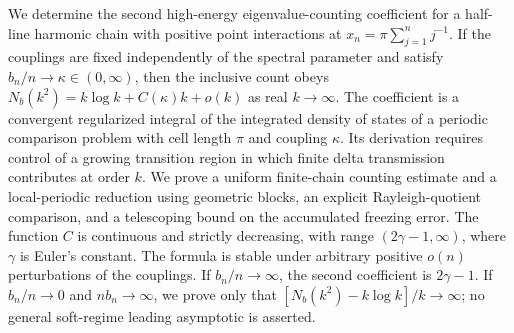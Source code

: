 We determine the second high-energy eigenvalue-counting coefficient for
a half-line harmonic chain with positive point interactions at
$x_n=\pi\sum_{j=1}^n j^{-1}$. If the couplings are fixed independently
of the spectral parameter and satisfy $b_n/n\to\kappa\in(0,\infty)$,
then the inclusive count obeys
$N_b(k^2)=k\log k+C(\kappa)k+o(k)$ as real $k\to\infty$.
The coefficient is a convergent regularized integral of the integrated
density of states of a periodic comparison problem with cell length
$\pi$ and coupling $\kappa$. Its derivation requires control of a
growing transition region in which finite delta transmission contributes
at order $k$. We prove a uniform finite-chain counting estimate and
a local-periodic reduction using geometric blocks, an explicit
Rayleigh-quotient comparison, and a telescoping bound on the accumulated
freezing error. The function $C$ is continuous and strictly decreasing,
with range $(2\gamma-1,\infty)$, where $\gamma$ is Euler's constant.
The formula is stable under arbitrary positive $o(n)$ perturbations
of the couplings. If $b_n/n\to\infty$, the second coefficient is
$2\gamma-1$. If $b_n/n\to0$ and $n b_n\to\infty$, we prove only
that $[N_b(k^2)-k\log k]/k\to\infty$; no general soft-regime
leading asymptotic is asserted.
